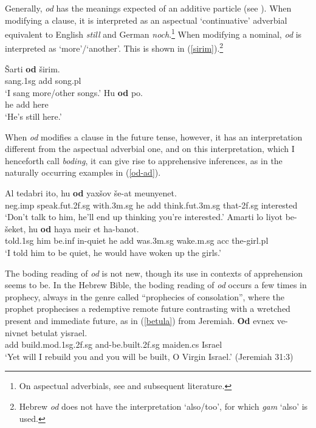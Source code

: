 \documentclass[output=paper,colorlinks,citecolor=brown]{langscibook}
\begin{document}
Generally, \textit{od} has the meanings expected of an additive particle (see \citealt{greenberg12}). When modifying a clause, it is interpreted as an aspectual `continuative' adverbial equivalent to English \textit{still} and German \textit{noch}.\footnote{On aspectual adverbials, see \citet{lobner89} and subsequent literature.} When modifying a nominal, \textit{od} is interpreted as `more'/`another'.  This is shown in (\ref{sirim}).\footnote{Hebrew \textit{od} does not have the interpretation `also/too', for which \textit{gam} `also' is used.} 

\ea
\label{sirim}
\begin{xlist}
\ex
\gll \v{S}arti \textbf{od} širim. \\
sang.1sg {\sc add} song.{\sc pl} \\
\glt  `I sang more/other songs.'
\ex
\gll Hu \textbf{od} po. \\
he {\sc add} here \\
\glt `He's still here.'
\end{xlist}
\z 

When \textit{od} modifies a clause in the future tense, however, it has an interpretation different from the aspectual adverbial one, and on this interpretation, which I henceforth call \textit{boding}, it can give rise to apprehensive inferences, as in the naturally occurring examples in (\ref{od-ad}).
\ea
\label{od-ad}
\begin{xlist}
\ex 
\gll  Al tedabri ito, hu \textbf{od} yaxšov še-at meunyenet. \\
{\sc neg.imp} speak.{\sc fut.2f.sg} with.{\sc 3m.sg} he {\sc add}  think.{\sc fut.3m.sg} that-{\sc 2f.sg} interested \\
\glt  `Don't talk to him, he'll end up thinking you're interested.'
\ex 
\gll  Amarti lo liyot be-šeket, hu \textbf{od} haya meir et ha-banot. \\
told.{\sc 1sg} him be.{\sc inf} in-quiet he {\sc add} was.{\sc 3m.sg} wake.{\sc m.sg} {\sc acc} the-girl.{\sc pl} \\
\glt  `I told him to be quiet, he would have woken up the girls.'
\end{xlist}
\z

The boding reading of \textit{od} is not new, though its use in contexts of apprehension seems to be. In the Hebrew Bible, the boding reading of \textit{od} occurs a few times in prophecy, always in the genre called ``prophecies of consolation'', where the prophet prophecises a redemptive remote future contrasting with a wretched present and immediate future, as in (\ref{betula}) from Jeremiah.
\ea
\label{betula}
\gll \textbf{Od} evnex ve-nivnet betulat yisrael.\\
 {\sc add} build.{\sc mod.1sg.2f.sg} and-be.built.{\sc 2f.sg} maiden.{\sc cs} Israel \\
\glt  `Yet will I rebuild you and you will be built, O Virgin Israel.' (Jeremiah 31:3)
\z
\end{document}
